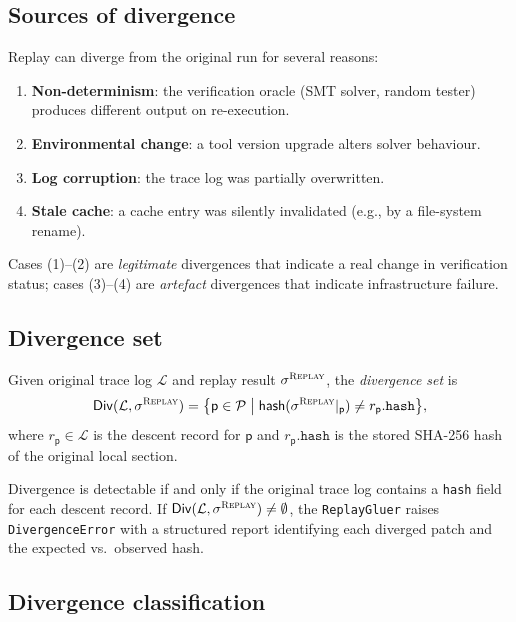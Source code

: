 \documentclass[11pt]{article}
\newcommand{\Replay}{\textsc{Replay}}
\newcommand{\TraceLog}{\mathcal{L}}
\newcommand{\Patch}{\mathsf{p}}
\newcommand{\PatchSet}{\mathcal{P}}
\newcommand{\DivSet}{\mathsf{Div}}
\newcommand{\GS}{\sigma}                   %
\newcommand{\HashFn}{\mathsf{hash}}
\begin{document}
\subsection{Sources of divergence}

Replay can diverge from the original run for several reasons:
\begin{enumerate}
\item \textbf{Non-determinism}: the verification oracle (SMT solver,
  random tester) produces different output on re-execution.
\item \textbf{Environmental change}: a tool version upgrade alters
  solver behaviour.
\item \textbf{Log corruption}: the trace log was partially overwritten.
\item \textbf{Stale cache}: a cache entry was silently invalidated
  (e.g., by a file-system rename).
\end{enumerate}

Cases (1)--(2) are \emph{legitimate} divergences that indicate a real
change in verification status; cases (3)--(4) are \emph{artefact}
divergences that indicate infrastructure failure.

\subsection{Divergence set}

\begin{definition}
\label{def:divset}
Given original trace log $\TraceLog$ and replay result $\GS^{\Replay}$,
the \emph{divergence set} is
\[
  \DivSet(\TraceLog, \GS^{\Replay})
  = \bigl\{\Patch \in \PatchSet \;\big|\;
    \HashFn(\GS^{\Replay}|_\Patch) \neq r_\Patch.\mathtt{hash}\bigr\},
\]
where $r_\Patch \in \TraceLog$ is the descent record for $\Patch$ and
$r_\Patch.\mathtt{hash}$ is the stored SHA-256 hash of the original
local section.
\end{definition}

\begin{proposition}
\label{prop:div-detect}
Divergence is detectable if and only if the original trace log contains
a \texttt{hash} field for each descent record.  If
$\DivSet(\TraceLog, \GS^{\Replay}) \neq \emptyset$, the
\texttt{ReplayGluer} raises \texttt{DivergenceError} with a structured
report identifying each diverged patch and the expected vs.\ observed
hash.
\end{proposition}

\subsection{Divergence classification}
\end{document}
